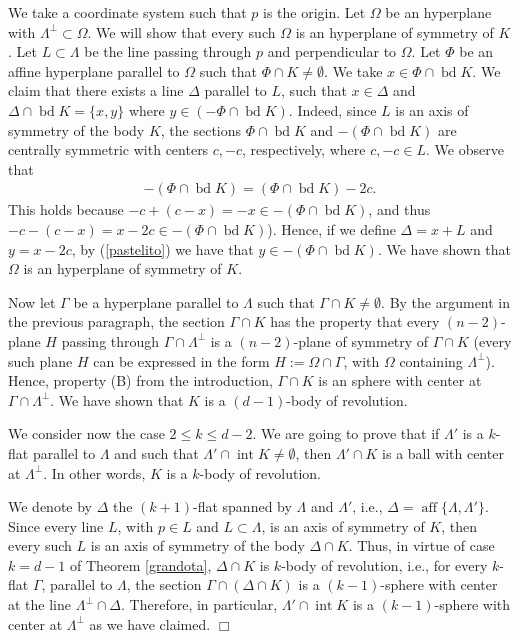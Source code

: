 \documentclass[12pt,thmsa]{amsart}
\newcommand{\inte}{\operatorname*{int}}
\newcommand{\aff}{\operatorname*{aff}}
\newcommand{\bd}{\operatorname*{bd}}
\begin{document}
We take a coordinate system such that $p$ is the origin. Let $\Omega$ be an hyperplane with $\Lambda ^{\perp} \subset \Omega$. We will show that every such $\Omega$ is an hyperplane of symmetry of $K$. Let $L\subset  \Lambda$ be the line passing through $p$ and perpendicular to $\Omega$. Let $\Phi$ be an affine hyperplane parallel to $\Omega$ such that $ \Phi \cap K\not= \emptyset$. We take $x\in \Phi \cap \bd K$. We claim that there exists a line $\Delta$ parallel to $L$, such that $x\in \Delta$ and $\Delta \cap \bd K=\{x,y\}$ where $y\in (-\Phi \cap \bd K)$. Indeed, since $L$ is an axis of symmetry of the body $K$, the sections $\Phi \cap \bd K$ and $-(\Phi \cap \bd K)$ are centrally symmetric with centers $c, -c$, respectively, where $c,-c\in L$. We observe that
\begin{eqnarray}\label{pastelito}
-(\Phi \cap \bd K)=(\Phi \cap \bd K)-2c.    
\end{eqnarray}
This holds because  $-c+(c-x)=-x\in -(\Phi \cap \bd K)$, and thus  $-c-(c-x)=x-2c \in -(\Phi \cap \bd K)$). Hence, if we define $\Delta=x+L$ and $y=x-2c$, by (\ref{pastelito}) we have that $y\in -(\Phi \cap \bd K)$. We have shown that $\Omega$ is an hyperplane of symmetry of $K$.

 Now let $\Gamma$ be a hyperplane parallel to $\Lambda$ such that $\Gamma \cap K\not=\emptyset$. By the argument in the previous paragraph, the section $\Gamma \cap K$ has the property that every $(n-2)$-plane $H$ passing through $\Gamma \cap \Lambda^{\perp}$ is a $(n-2)$-plane of symmetry of $\Gamma \cap K$ (every such plane $H$ can be expressed in the form $H:=\Omega \cap \Gamma$, with $\Omega$ containing $\Lambda^{\perp}$). Hence, property (B) from the introduction,  $\Gamma \cap K$ is an sphere with center at $\Gamma \cap \Lambda^{\perp}$. We have shown that $K$ is a $(d-1)$-body of revolution. 


  
We consider now the case $2 \leq  k \leq d-2$. We are going to prove that if $\Lambda'$ is a $k$-flat parallel to $\Lambda$ and such that $\Lambda' \cap \inte K \not= \emptyset$, then $\Lambda' \cap K$ is a ball with center at $\Lambda ^\perp$. In other words, $K$ is a $k$-body of revolution.

We denote by $\Delta$ the $(k+1)$-flat spanned by $\Lambda$ and $\Lambda'$, i.e., $\Delta=\aff\{\Lambda,\Lambda'\}$. Since every line $L$, with $p\in L$ and $L\subset \Lambda$, is an axis of symmetry of $K$, then every such $L$ is an axis of symmetry of the body $\Delta \cap K$. Thus, in virtue of case $k=d-1$ of Theorem \ref{grandota}, $\Delta \cap K$ is $k$-body of revolution, i.e., for every $k$-flat $\Gamma$, parallel to $\Lambda$, the section $\Gamma \cap (\Delta\cap K)$ is a $(k-1)$-sphere with center at the line $\Lambda ^\perp \cap \Delta$. Therefore, in particular, $\Lambda' \cap \inte K$ is a $(k-1)$-sphere with center at $\Lambda ^\perp$ as we have claimed.  $\Box$ 
\end{document}
